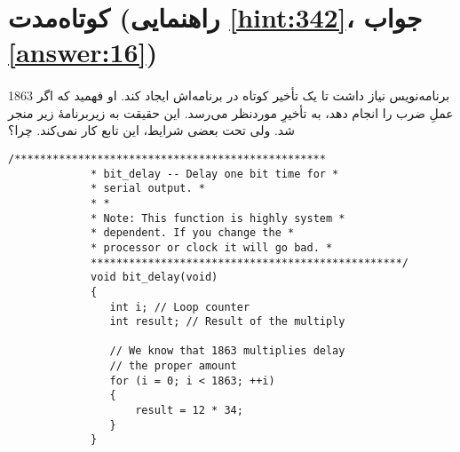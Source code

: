 \section[کوتاه‌مدت]{کوتاه‌مدت \protect{} (راهنمایی \ref{hint:342}، جواب \ref{answer:16})}
\paragraph{}\label{prog:108}
برنامه‌نویس نیاز داشت تا یک تأخیر کوتاه در برنامه‌اش ایجاد کند. او فهمید که اگر 1863 عملِ ضرب را انجام دهد، به تأخیرِ موردنظر می‌رسد. این حقیقت به زیربرنامهٔ زیر منجر شد. ولی تحت بعضی شرایط، این تابع کار نمی‌کند. چرا؟

\begin{LTR}
        \begin{lstlisting}[style=C++Style]
             /*************************************************
             * bit_delay -- Delay one bit time for *
             * serial output. *
             * *
             * Note: This function is highly system *
             * dependent. If you change the *
             * processor or clock it will go bad. *
             *************************************************/
             void bit_delay(void)
             {
             	int i; // Loop counter
             	int result; // Result of the multiply

             	// We know that 1863 multiplies delay
             	// the proper amount
             	for (i = 0; i < 1863; ++i)
             	{
             		result = 12 * 34;
             	}
             }
        \end{lstlisting}
\end{LTR}
